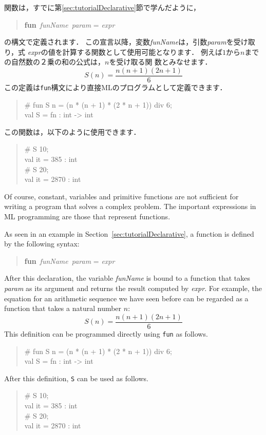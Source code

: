 \documentclass{jbook}
\newenvironment{program}{\begin{quote}\begin{tt}}%
                        {\end{tt}\end{quote}}
\begin{document}
	関数は，すでに第\ref{sec:tutorialDeclarative}節で学んだように，
\begin{program}
{\bf fun}\ {\it funName}\ {\it param} = {\it expr}
\end{program}
の構文で定義されます．
	この宣言以降，変数{\it funName}は，引数{\it param}を受け取り，式
{\it expr}の値を計算する関数として使用可能となります．
	例えば$1$から$n$までの自然数の２乗の和の公式は，$n$を受け取る関
数とみなせます．
\[
\mbox{$S(n)$} = \frac{n (n + 1) (2n + 1)}{6}
\]
	この定義は{\tt fun}構文により直接MLのプログラムとして定義できます．
\begin{program}
\# fun S n = (n * (n + 1) * (2 * n + 1)) div 6;\\
val S = fn : int -> int
\end{program}
	この関数は，以下のように使用できます．
\begin{program}
\# S 10;\\
val it = 385 : int\\
\# S 20;\\
val it = 2870 : int
\end{program}

\else%
	Of course, constant, variables and primitive functions are not
sufficient for writing a program that solves a complex problem.
	The important expressions in ML programming are those that
represent functions.

	As seen in an example in Section~\ref{sec:tutorialDeclarative}, 
a function is defined by the following syntax:
\begin{program}
{\bf fun}\ {\it funName}\ {\it param} = {\it expr}
\end{program}
	After this declaration, the variable {\it funName} is bound to a
function that takes {\it param} as its argument and returns the result
computed by {\it expr}.
	For example, the equation for an arithmetic sequence we have
seen before can be regarded as a function that takes a natural number
$n$:
\[
\mbox{$S(n)$} = \frac{n (n + 1) (2n + 1)}{6}
\]
	This definition can be programmed directly using {\tt fun} as follows.
\begin{program}
\# fun S n = (n * (n + 1) * (2 * n + 1)) div 6;\\
val S = fn : int -> int
\end{program}
	After this definition, {\tt S} can be used as follows.
\begin{program}
\# S 10;\\
val it = 385 : int\\
\# S 20;\\
val it = 2870 : int
\end{program}
\end{document}
